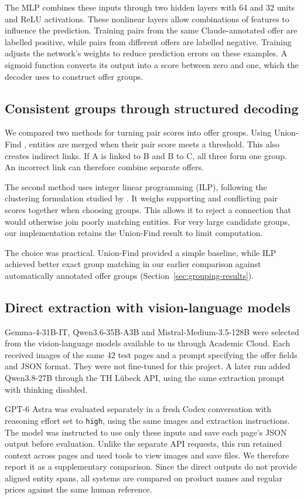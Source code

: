 The MLP combines these inputs through two hidden layers with 64 and 32 units and ReLU activations. These nonlinear layers allow combinations of features to influence the prediction. Training pairs from the same Claude-annotated offer are labelled positive, while pairs from different offers are labelled negative. Training adjusts the network's weights to reduce prediction errors on these examples. A sigmoid function converts its output into a score between zero and one, which the decoder uses to construct offer groups.

\subsection{Consistent groups through structured decoding}
We compared two methods for turning pair scores into offer groups. Using Union-Find \citep{tarjan1975}, entities are merged when their pair score meets a threshold. This also creates indirect links. If A is linked to B and B to C, all three form one group. An incorrect link can therefore combine separate offers.

The second method uses integer linear programming (ILP), following the clustering formulation studied by \citet{groetschel1989}. It weighs supporting and conflicting pair scores together when choosing groups. This allows it to reject a connection that would otherwise join poorly matching entities. For very large candidate groups, our implementation retains the Union-Find result to limit computation.

The choice was practical. Union-Find provided a simple baseline, while ILP achieved better exact group matching in our earlier comparison against automatically annotated offer groups (Section~\ref{sec:grouping-results}).

\subsection{Direct extraction with vision-language models}
Gemma-4-31B-IT, Qwen3.6-35B-A3B and Mistral-Medium-3.5-128B were selected from the vision-language models available to us through Academic Cloud. Each received images of the same 42 test pages and a prompt specifying the offer fields and JSON format. They were not fine-tuned for this project. A later run added Qwen3.8-27B through the TH L\"ubeck API, using the same extraction prompt with thinking disabled.

GPT-6 Astra was evaluated separately in a fresh Codex conversation with reasoning effort set to \texttt{high}, using the same images and extraction instructions. The model was instructed to use only these inputs and save each page's JSON output before evaluation. Unlike the separate API requests, this run retained context across pages and used tools to view images and save files. We therefore report it as a supplementary comparison. Since the direct outputs do not provide aligned entity spans, all systems are compared on product names and regular prices against the same human reference.

